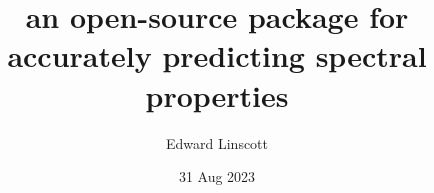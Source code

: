 \documentclass[xcolor=table,aspectratio=169]{beamer}
\title{\noindent\large{an open-source package for accurately predicting spectral properties}}
\author{Edward Linscott}
\institute{EPFL}
\date{31 Aug 2023}
\newcommand\blfootcite[1]{%
  \begingroup
  \renewcommand\thefootnote{}\footnote{\hspace{-4ex}\cite{#1}}%
  \addtocounter{footnote}{-1}%
  \endgroup
}
\numberwithin{equation}{section}
\begin{document}
\frame{\titlepage}

% 
% 


% 
% 
% 
% 
% 
% 
\end{document}
